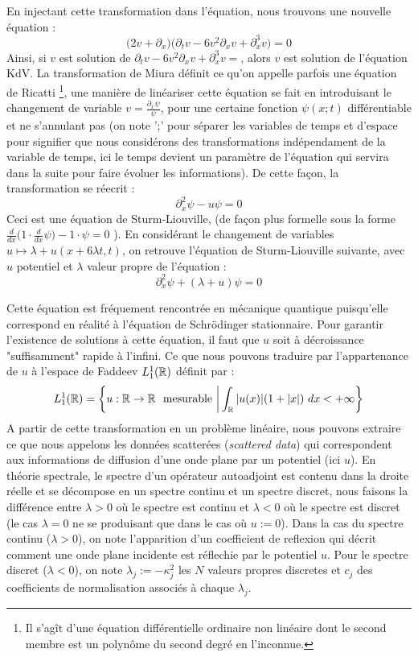 En injectant cette transformation dans l'équation, nous trouvons une nouvelle équation :
$$\Big(2v + \partial_x\Big)\Big( \partial_t v - 6 v^2\partial_xv + \partial_x^3v \Big) = 0$$
Ainsi, si $v$ est solution de $\partial_t v - 6 v^2\partial_xv + \partial_x^3v =$, alors $v$ est solution de l'équation KdV.
La transformation de Miura définit ce qu'on appelle parfois une équation de Ricatti \footnote{Il s'agît d'une équation différentielle ordinaire non linéaire dont le second membre est un polynôme du second degré en l'inconnue.}, une manière de linéariser cette équation se fait en introduisant le changement de variable $v = \frac{\partial_x\psi}{\psi}$, pour une certaine fonction $\psi(x;t)$ différentiable et ne s'annulant pas (on note ';' pour séparer les variables de temps et d'espace pour signifier que nous considérons des transformations indépendament de la variable de temps, ici le temps devient un paramètre de l'équation qui servira dans la suite pour faire évoluer les informations).
De cette façon, la transformation se réecrit :
$$\partial_x^2\psi - u\psi = 0$$
Ceci est une équation de Sturm-Liouville, (de façon plus formelle sous la forme $\frac{d}{dx}\big(1\cdot\frac{d}{dx}\psi\big) - 1\cdot\psi = 0$ ).
En considérant le changement de variables $u \mapsto \lambda + u(x + 6\lambda t,t)$, on retrouve l'équation de Sturm-Liouville suivante, avec $u$ potentiel et $\lambda$ valeur propre de l'équation :
$$\partial_x^2 \psi + (\lambda + u)\psi = 0$$

Cette équation est fréquement rencontrée en mécanique quantique puisqu'elle correspond en réalité à l'équation de Schrödinger stationnaire. 
Pour garantir l'existence de solutions à cette équation, il faut que $u$ soit à décroissance "suffisamment" rapide à l'infini. Ce que nous pouvons traduire par l'appartenance de $u$ à l'espace de Faddeev $L^1_1(\mathbb{R})$ définit par :
$$L^1_1(\mathbb{R}) = \bigg\{ u:\mathbb{R} \to \mathbb{R} \ \text{ mesurable} \ \bigg| \int_{\mathbb{R}} |u(x)|(1 + |x|) \ dx < +\infty \bigg\}$$
A partir de cette transformation en un problème linéaire, nous pouvons extraire ce que nous appelons les données scatterées (\textit{scattered data}) qui correspondent aux informations de diffusion d'une onde plane par un potentiel (ici $u$). 
En théorie spectrale, le spectre d'un opérateur autoadjoint est contenu dans la droite réelle et se décompose en un spectre continu et un spectre discret, nous faisons la différence entre $\lambda >0$ où le spectre est continu et $\lambda < 0$ où le spectre est discret (le cas $\lambda = 0$ ne se produisant que dans le cas où $u := 0$).
Dans la cas du spectre continu ($\lambda >0$), on note l'apparition d'un coefficient de reflexion qui décrit comment une onde plane incidente est réflechie par le potentiel $u$. Pour le spectre discret ($\lambda<0$), on note $\lambda_j := -\kappa_j^2$ les $N$ valeurs propres discretes et $c_j$ des coefficients de normalisation associés à chaque $\lambda_j$.

